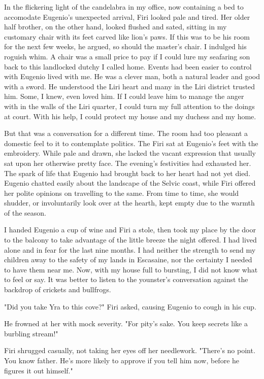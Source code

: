 \documentclass{article}
\begin{document}
In the flickering light of the candelabra in my office, now containing a bed to accomodate Eugenio's unexpected arrival, Firi looked pale and tired. Her older half brother, on the other hand, looked flushed and sated, sitting in my customary chair with its feet carved like lion's paws. If this was to be his room for the next few weeks, he argued, so should the master's chair. I indulged his roguish whim. A chair was a small price to pay if I could lure my seafaring son back to this landlocked dutchy I called home. Events had been easier to control with Eugenio lived with me. He was a clever man, both a natural leader and good with a sword. He understood the Liri heart and many in the Liri district trusted him. Some, I knew, even loved him. If I could leave him to manage the anger with in the walls of the Liri quarter, I could turn my full attention to the doings at court. With his help, I could protect my house and my duchess and my home.

But that was a conversation for a different time. The room had too pleasant a domestic feel to it to contemplate politics. The Firi sat at Eugenio's feet with the embroidery. While pale and drawn, she lacked the vacant expression that usually sat upon her otherwise pretty face. The evening's festivities had exhausted her. The spark of life that Eugenio had brought back to her heart had not yet died. Eugenio chatted easily about the landscape of the Selvic coast, while Firi offered her polite opinions on travelling to the same. From time to time, she would shudder, or involuntarily look over at the hearth, kept empty due to the warmth of the season.

I handed Eugenio a cup of wine and Firi a stole, then took my place by the door to the balcony to take advantage of the little breeze the night offered. I had lived alone and in fear for the last nine months. I had neither the strength to send my children away to the safety of my lands in Escasaine, nor the certainty I needed to have them near me. Now, with my house full to bursting, I did not know what to feel or say. It was better to listen to the younster's conversation against the backdrop of crickets and bullfrogs.

"Did you take Yra to this cove?" Firi asked, causing Eugenio to cough in his cup.

He frowned at her with mock severity. "For pity's sake. You keep secrets like a burbling stream!"

Firi shrugged casually, not taking her eyes off her needlework. "There's no point. You know father. He's more likely to approve if you tell him now, before he figures it out himself."
\end{document}
